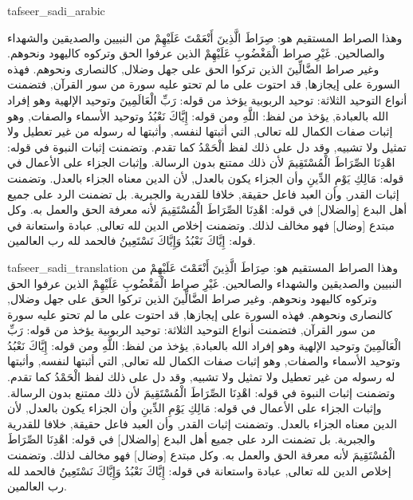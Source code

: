 \begin{taggedblock}{tafseer_sadi_arabic}
\begin{Arabic}
وهذا الصراط المستقيم هو:
{ صِرَاطَ الَّذِينَ أَنْعَمْتَ عَلَيْهِمْ }
من النبيين والصديقين والشهداء والصالحين.
{ غَيْرِ }
صراط
{ الْمَغْضُوبِ عَلَيْهِمْ }
الذين عرفوا الحق وتركوه كاليهود ونحوهم. وغير صراط
{ الضَّالِّينَ }
الذين تركوا الحق على جهل وضلال, كالنصارى ونحوهم. فهذه السورة على إيجازها, قد احتوت على ما لم تحتو عليه سورة من سور القرآن, فتضمنت أنواع التوحيد الثلاثة: توحيد الربوبية يؤخذ من قوله:
{ رَبِّ الْعَالَمِينَ }
وتوحيد الإلهية وهو إفراد الله بالعبادة, يؤخذ من لفظ:
{ اللَّهِ }
ومن قوله:
{ إِيَّاكَ نَعْبُدُ }
وتوحيد الأسماء والصفات, وهو إثبات صفات الكمال لله تعالى, التي أثبتها لنفسه, وأثبتها له رسوله من غير تعطيل ولا تمثيل ولا تشبيه, وقد دل على ذلك لفظ
{ الْحَمْدُ }
كما تقدم. وتضمنت إثبات النبوة في قوله:
{ اهْدِنَا الصِّرَاطَ الْمُسْتَقِيمَ }
لأن ذلك ممتنع بدون الرسالة. وإثبات الجزاء على الأعمال في قوله:
{ مَالِكِ يَوْمِ الدِّينِ }
وأن الجزاء يكون بالعدل, لأن الدين معناه الجزاء بالعدل. وتضمنت إثبات القدر, وأن العبد فاعل حقيقة, خلافا للقدرية والجبرية. بل تضمنت الرد على جميع أهل البدع
[والضلال]
في قوله:
{ اهْدِنَا الصِّرَاطَ الْمُسْتَقِيمَ }
لأنه معرفة الحق والعمل به. وكل مبتدع
[وضال]
فهو مخالف لذلك. وتضمنت إخلاص الدين لله تعالى, عبادة واستعانة في قوله:
{ إِيَّاكَ نَعْبُدُ وَإِيَّاكَ نَسْتَعِينُ }
فالحمد لله رب العالمين.
\end{Arabic}
\end{taggedblock}
\begin{taggedblock}{tafseer_sadi_translation}
وهذا الصراط المستقيم هو:
{ صِرَاطَ الَّذِينَ أَنْعَمْتَ عَلَيْهِمْ }
من النبيين والصديقين والشهداء والصالحين.
{ غَيْرِ }
صراط
{ الْمَغْضُوبِ عَلَيْهِمْ }
الذين عرفوا الحق وتركوه كاليهود ونحوهم. وغير صراط
{ الضَّالِّينَ }
الذين تركوا الحق على جهل وضلال, كالنصارى ونحوهم. فهذه السورة على إيجازها, قد احتوت على ما لم تحتو عليه سورة من سور القرآن, فتضمنت أنواع التوحيد الثلاثة: توحيد الربوبية يؤخذ من قوله:
{ رَبِّ الْعَالَمِينَ }
وتوحيد الإلهية وهو إفراد الله بالعبادة, يؤخذ من لفظ:
{ اللَّهِ }
ومن قوله:
{ إِيَّاكَ نَعْبُدُ }
وتوحيد الأسماء والصفات, وهو إثبات صفات الكمال لله تعالى, التي أثبتها لنفسه, وأثبتها له رسوله من غير تعطيل ولا تمثيل ولا تشبيه, وقد دل على ذلك لفظ
{ الْحَمْدُ }
كما تقدم. وتضمنت إثبات النبوة في قوله:
{ اهْدِنَا الصِّرَاطَ الْمُسْتَقِيمَ }
لأن ذلك ممتنع بدون الرسالة. وإثبات الجزاء على الأعمال في قوله:
{ مَالِكِ يَوْمِ الدِّينِ }
وأن الجزاء يكون بالعدل, لأن الدين معناه الجزاء بالعدل. وتضمنت إثبات القدر, وأن العبد فاعل حقيقة, خلافا للقدرية والجبرية. بل تضمنت الرد على جميع أهل البدع
[والضلال]
في قوله:
{ اهْدِنَا الصِّرَاطَ الْمُسْتَقِيمَ }
لأنه معرفة الحق والعمل به. وكل مبتدع
[وضال]
فهو مخالف لذلك. وتضمنت إخلاص الدين لله تعالى, عبادة واستعانة في قوله:
{ إِيَّاكَ نَعْبُدُ وَإِيَّاكَ نَسْتَعِينُ }
فالحمد لله رب العالمين.
\end{taggedblock}

\begin{comment}
Please use the following for footnotes:- Sample\footnoteQ{Text of Qur'an footnote goes here.}.
Sample\footnoteT{Text of Tafseer footnote goes here.}.
\end{comment}